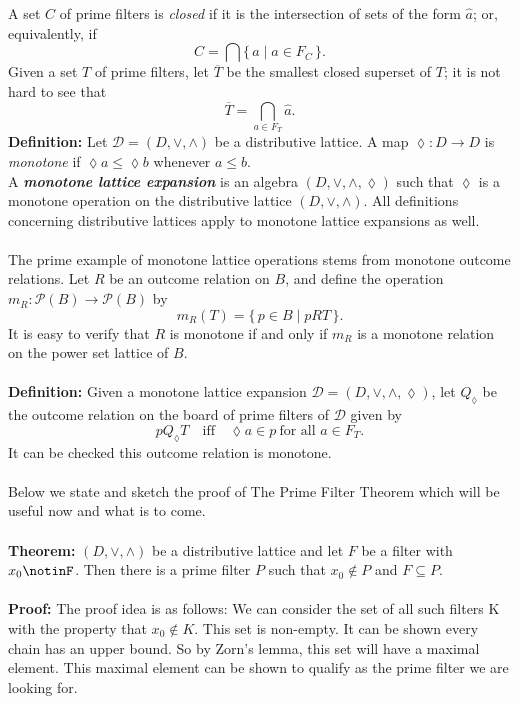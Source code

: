 \documentclass[12pt]{article}
\begin{document}
A set $C$ of prime filters is \emph{closed} if it is the intersection of 
sets of the form $\hat{a}$; or, equivalently, if 
\[
   C = \bigcap \{\, \hat{a} \mid a \in F_C \,\}.
\]
Given a set $T$ of prime filters, let $\overline{T}$ be the smallest 
closed superset of $T$; it is not hard to see that 
\[
   \overline{T} = \bigcap_{a \in F_T} \hat{a}. 
   \]
\textbf{Definition:} Let $\mathcal{D} = (D, \vee, \wedge)$ be a distributive lattice. 
A map $\lozenge : D \to D$ is \emph{monotone} if $\lozenge a \leq \lozenge b$ whenever $a \leq b$. \\
A \textbf{\emph{monotone lattice expansion}} is an algebra $(D, \vee, \wedge, \lozenge)$ such that $\lozenge$ is a monotone operation on the distributive lattice $(D, \vee, \wedge)$.  
All definitions concerning distributive lattices apply to monotone lattice expansions as well. \\ \\
The prime example of monotone lattice operations stems from monotone 
outcome relations. Let $R$ be an outcome relation on $B$, and define the 
operation $m_R : \mathcal{P}(B) \to \mathcal{P}(B)$ by
\[
m_R(T) = \{\, p \in B \mid pRT \,\}.
\]
It is easy to verify that $R$ is monotone if and only if $m_R$ is a monotone 
relation on the power set lattice of $B$. \\ \\
\textbf{Definition:}  
Given a monotone lattice expansion $\mathcal{D} = (D, \vee, \wedge, \lozenge)$,  
let $Q_{\lozenge}$ be the outcome relation on the board of prime filters of $\mathcal{D}$ given by
\[
p Q_{\lozenge} T \quad \text{iff} \quad \lozenge a \in p \ \text{for all } a \in F_{T}.
\]
It can be checked this outcome relation is monotone. \\ \\
Below we state and sketch the proof of The Prime Filter Theorem which will be useful now and what is to come. \\ \\
\textbf{Theorem:} $(D,\vee,\wedge)$ be a distributive lattice and let $F$ be a filter with $x_0\notinF$. 
Then there is a prime filter $P$ such that $x_0\notin P$ and $F\subseteq P$.\\ \\
\textbf{Proof:} The proof idea is as follows: We can consider the set of all such filters K with the property that $x_0 \notin K $. This set is non-empty. It can be shown every chain has an upper bound. So by Zorn's lemma, this set will have a maximal element. This maximal element can be shown to qualify as the prime filter we are looking for. \\ \\
\end{document}
